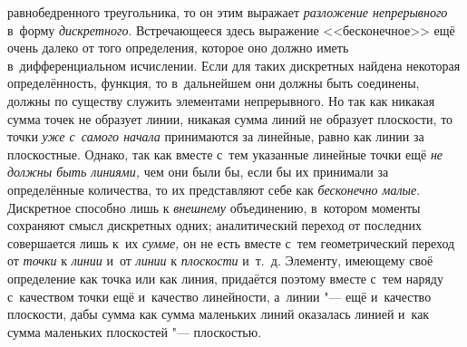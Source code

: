 равнобедренного треугольника, то он этим выражает {\em разложение непрерывного}
в~форму {\em дискретного}. Встречающееся здесь выражение <<бесконечное>> ещё
очень далеко от того определения, которое оно должно иметь в~дифференциальном
исчислении. Если для таких дискретных найдена некоторая определённость,
функция, то в~дальнейшем они должны быть соединены, должны по существу служить
элементами непрерывного. Но так как никакая сумма точек не образует линии,
никакая сумма линий не образует плоскости, то точки {\em уже с~самого начала}
принимаются за линейные, равно как линии за плоскостные. Однако, так как вместе
с~тем указанные линейные точки ещё {\em не должны быть линиями,} чем они были
бы, если бы их принимали за определённые количества, то их представляют себе
как {\em бесконечно малые}. Дискретное способно лишь к {\em внешнему}
объединению, в~котором моменты сохраняют смысл дискретных одних; аналитический
переход от последних совершается лишь к~их {\em сумме,} он не есть вместе с~тем
геометрический переход от {\em точки} к {\em линии} и~от {\em линии} к
{\em плоскости} и~т.~д. Элементу, имеющему своё определение как точка или как
линия, придаётся поэтому вместе с~тем наряду с~качеством точки ещё и~качество
линейности, а~линии "--- ещё и~качество плоскости, дабы сумма как сумма
маленьких линий оказалась линией и~как сумма маленьких плоскостей "---
плоскостью.

